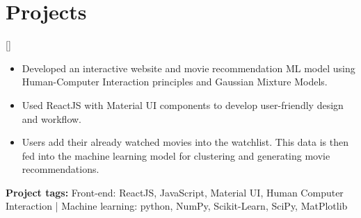 \documentclass{article}
\begin{document}




 
\section{Projects}


[]
\begin{itemize}
\item Developed an interactive website and movie recommendation ML model using Human-Computer Interaction principles and Gaussian Mixture Models. 
\item Used ReactJS with Material UI components to develop user-friendly design and workflow.
\item Users add their already watched movies into the watchlist. This data is then fed into the machine learning model for clustering and generating movie recommendations.
\end{itemize}
\textbf{Project tags:} 
Front-end: ReactJS, JavaScript, Material UI, Human Computer Interaction | Machine learning: python, NumPy, Scikit-Learn, SciPy, MatPlotlib 
\end{document}
